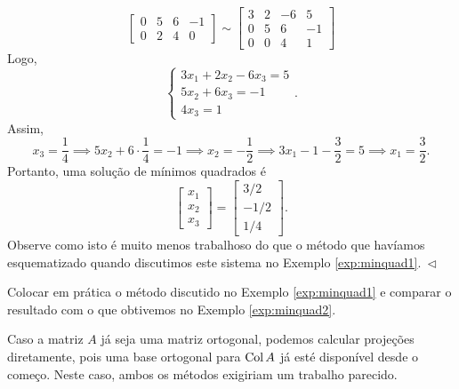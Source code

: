 \documentclass[../livro.tex]{subfiles}  %
\begin{document}
\begin{example}
\begin{equation}
\begin{bmatrix}
    0 & 5 &  6 & -1 \\
    0 & 2 &  4 & 0
  \end{bmatrix} \sim
  \begin{bmatrix}
    3 & 2 & -6 & 5 \\
    0 & 5 &  6 & -1 \\
    0 & 0 &  4 & 1
  \end{bmatrix}
  \end{equation} Logo,
  \begin{equation}
  \left\{
    \begin{array}{ll}
      3 x_1 + 2 x_2 - 6 x_3 = 5 \\
      5x_2 + 6 x_3 = -1 \\
      4x_3 = 1
    \end{array}
  \right..
  \end{equation} Assim,
  \begin{equation}
  x_3 = \frac{1}{4} \implies 5x_2 + 6 \cdot \frac{1}{4} = -1 \implies x_2 = -\frac{1}{2} \implies 3 x_1 - 1 - \frac{3}{2}  = 5 \implies x_1 = \frac{3}{2}.
  \end{equation} Portanto, uma solução de mínimos quadrados é
  \begin{equation}
  \begin{bmatrix}
    x_1 \\ x_2 \\ x_3
  \end{bmatrix} =
  \begin{bmatrix}
    3/2 \\ -1/2 \\ 1/4
  \end{bmatrix}.
  \end{equation} Observe como isto é muito menos trabalhoso do que o método que havíamos esquematizado quando discutimos este sistema no Exemplo \ref{exp:minquad1}$. \ \lhd$
\end{example}

\begin{exercise}
  Colocar em prática o método discutido no Exemplo \ref{exp:minquad1} e comparar o resultado com o que obtivemos no Exemplo \ref{exp:minquad2}.
\end{exercise}

\begin{remark}
  Caso a matriz $A$ já seja uma matriz ortogonal, podemos calcular projeções diretamente, pois uma base ortogonal para $\operatorname{Col} A$ já esté disponível desde o começo. Neste caso, ambos os métodos exigiriam um trabalho parecido.
\end{remark}
\end{document}
